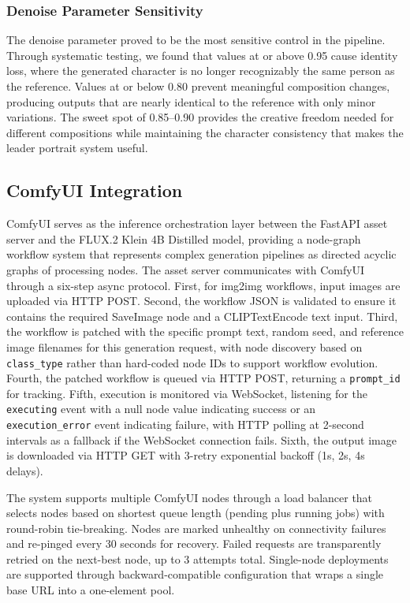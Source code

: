 \documentclass[conference]{IEEEtran}
\begin{document}
\subsubsection{Denoise Parameter Sensitivity}

The denoise parameter proved to be the most sensitive control in the pipeline. Through systematic testing, we found that values at or above 0.95 cause identity loss, where the generated character is no longer recognizably the same person as the reference. Values at or below 0.80 prevent meaningful composition changes, producing outputs that are nearly identical to the reference with only minor variations. The sweet spot of 0.85--0.90 provides the creative freedom needed for different compositions while maintaining the character consistency that makes the leader portrait system useful.


\subsection{ComfyUI Integration}

ComfyUI serves as the inference orchestration layer between the FastAPI asset server and the FLUX.2 Klein 4B Distilled model, providing a node-graph workflow system that represents complex generation pipelines as directed acyclic graphs of processing nodes. The asset server communicates with ComfyUI through a six-step async protocol. First, for img2img workflows, input images are uploaded via HTTP POST. Second, the workflow JSON is validated to ensure it contains the required SaveImage node and a CLIPTextEncode text input. Third, the workflow is patched with the specific prompt text, random seed, and reference image filenames for this generation request, with node discovery based on \texttt{class\_type} rather than hard-coded node IDs to support workflow evolution. Fourth, the patched workflow is queued via HTTP POST, returning a \texttt{prompt\_id} for tracking. Fifth, execution is monitored via WebSocket, listening for the \texttt{executing} event with a null node value indicating success or an \texttt{execution\_error} event indicating failure, with HTTP polling at 2-second intervals as a fallback if the WebSocket connection fails. Sixth, the output image is downloaded via HTTP GET with 3-retry exponential backoff (1s, 2s, 4s delays).

The system supports multiple ComfyUI nodes through a load balancer that selects nodes based on shortest queue length (pending plus running jobs) with round-robin tie-breaking. Nodes are marked unhealthy on connectivity failures and re-pinged every 30 seconds for recovery. Failed requests are transparently retried on the next-best node, up to 3 attempts total. Single-node deployments are supported through backward-compatible configuration that wraps a single base URL into a one-element pool.
\end{document}
